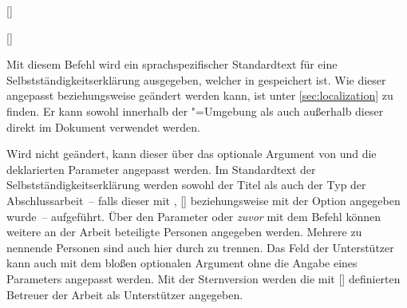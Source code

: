 \begin{Declaration*}{}
\begin{Declaration*}{}
\begin{Declaration*}{}
\begin{Declaration}{[]}
\begin{Declaration}[v2.05]{[\LParameter]}
\begin{Declaration}{}
\begin{Declaration}{}
\begin{Declaration}{}
\begin{Declaration}{}
\begin{Declaration}[v2.02]{}
\begin{Declaration}[v2.02]{%
}
\begin{Declaration}[v2.02]{%
}
\begin{Declaration}{}
\printdeclarationlist%
%
%
Mit diesem Befehl wird ein sprachspezifischer Standardtext für eine 
Selbstständigkeitserklärung ausgegeben, welcher in  
gespeichert ist. Wie dieser angepasst beziehungsweise geändert werden kann, ist 
unter \autoref{sec:localization} zu finden. Er kann sowohl innerhalb der 
"=Umgebung als auch außerhalb dieser direkt im 
Dokument verwendet werden. 

Wird  nicht geändert, kann dieser über das optionale 
Argument von  und die deklarierten Parameter angepasst 
werden. Im Standardtext der Selbstständigkeitserklärung werden sowohl der Titel 
als auch der Typ der Abschlussarbeit~-- falls dieser mit , 
[] beziehungsweise mit der 
Option  angegeben wurde~-- aufgeführt. Über den Parameter 
 oder \emph{zuvor} mit dem Befehl 
 können weitere an der Arbeit beteiligte Personen angegeben 
werden. Mehrere zu nennende Personen sind auch hier durch  zu 
trennen. Das Feld der Unterstützer kann auch mit dem bloßen optionalen Argument 
ohne die Angabe eines Parameters angepasst werden. 
Mit der Sternversion werden die mit [] 
definierten Betreuer der Arbeit als Unterstützer angegeben.


\end{Declaration}
\end{Declaration}
\end{Declaration}
\end{Declaration}
\end{Declaration}
\end{Declaration}
\end{Declaration}
\end{Declaration}
\end{Declaration}
\end{Declaration}
\end{Declaration*}
\end{Declaration*}
\end{Declaration*}
